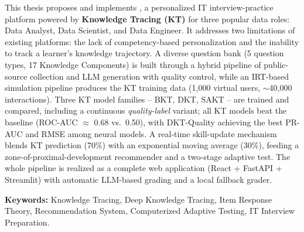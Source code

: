 \smallskip
This thesis proposes and implements \system{}, a personalized IT interview-practice platform powered by \textbf{Knowledge Tracing (KT)} for three popular data roles: Data Analyst, Data Scientist, and Data Engineer. It addresses two limitations of existing platforms: the lack of competency-based personalization and the inability to track a learner's knowledge trajectory. A diverse question bank (5 question types, 17 Knowledge Components) is built through a hybrid pipeline of public-source collection and LLM generation with quality control, while an IRT-based simulation pipeline produces the KT training data (1{,}000 virtual users, $\sim$40{,}000 interactions). Three KT model families -- BKT, DKT, SAKT -- are trained and compared, including a continuous \textit{quality-label} variant; all KT models beat the baseline (ROC-AUC $\approx$ 0.68 vs.\ 0.50), with DKT-Quality achieving the best PR-AUC and RMSE among neural models. A real-time skill-update mechanism blends KT prediction (70\%) with an exponential moving average (30\%), feeding a zone-of-proximal-development recommender and a two-stage adaptive test. The whole pipeline is realized as a complete web application (React + FastAPI + Streamlit) with automatic LLM-based grading and a local fallback grader.

\noindent\textbf{Keywords:} Knowledge Tracing, Deep Knowledge Tracing, Item Response Theory, Recommendation System, Computerized Adaptive Testing, IT Interview Preparation.
